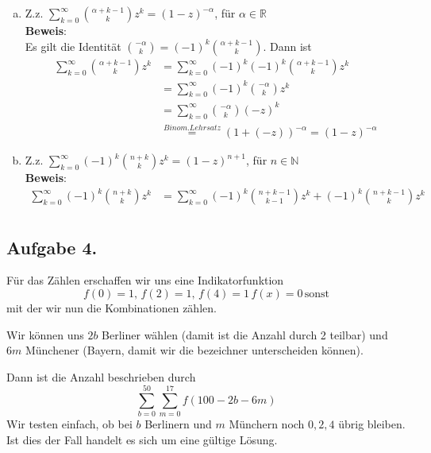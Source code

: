 \documentclass[11pt,a4paper,ngerman]{article}
\begin{document}
\begin{enumerate}[a)]
\item Z.z. $ \sum_{k=0}^\infty \binom{\alpha +k -1}{k} z^k = (1-z)^{-\alpha} $, für $\alpha \in \mathbb{R}$ \\

\textbf{Beweis}: \\
Es gilt die Identität $\binom{-\alpha}{k} = (-1)^k \binom{\alpha + k -1}{k}$. Dann ist
\begin{equation*}\begin{split}
\sum_{k=0}^\infty \binom{\alpha +k -1}{k} z^k
&= \sum_{k=0}^\infty (-1)^k (-1)^k \binom{\alpha +k -1}{k} z^k \\
&= \sum_{k=0}^\infty (-1)^k \binom{-\alpha}{k} z^k \\
&= \sum_{k=0}^\infty \binom{-\alpha}{k} (-z)^k \\
&\stackrel{Binom.Lehrsatz}{=} (1 + (-z))^{-\alpha} = (1 - z)^{-\alpha}
\end{split}\end{equation*}
\item Z.z. $\sum_{k=0}^\infty (-1)^k \binom{n+k}{k} z^k = (1-z)^{n+1}$, für $n \in \mathbb{N}$ \\

\textbf{Beweis}:
\begin{equation*}\begin{split}
\sum_{k=0}^\infty (-1)^k \binom{n+k}{k} z^k 
&= \sum_{k=0}^\infty (-1)^k \binom{n+k-1}{k-1} z^k + (-1)^k \binom{n+k-1}{k} z^k \\
\end{split}\end{equation*}

\end{enumerate}

\subsection*{Aufgabe 4.}

Für das Zählen erschaffen wir uns eine Indikatorfunktion
$$
    f(0) = 1, \, f(2) = 1, \, f(4) = 1 \, f(x) = 0 \, \text{sonst}
$$
mit der wir nun die Kombinationen zählen.

Wir können uns $2b$ Berliner wählen (damit ist die Anzahl durch 2 teilbar)
und $6m$ Münchener (Bayern, damit wir die bezeichner unterscheiden können).

Dann ist die Anzahl beschrieben durch
$$
    \overset{50}{\underset{b=0}{\sum}} \overset{17}{\underset{m=0}{\sum}} f(100 - 2b - 6m)
$$
Wir testen einfach, ob bei $b$ Berlinern und $m$ Münchern noch $0,2,4$ übrig bleiben. Ist dies
der Fall handelt es sich um eine gültige Lösung.
\end{document}
